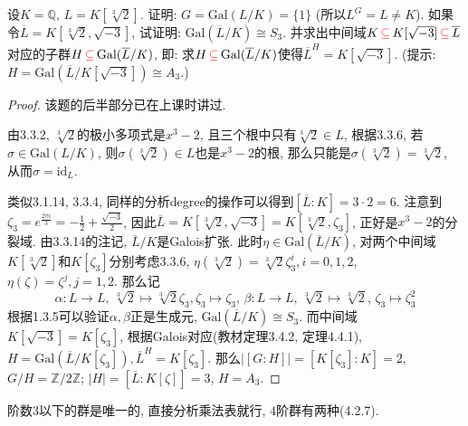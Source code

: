 \documentclass{../solutions-cn}
\begin{document}
\begin{exercise}[习题3.4.2]
    设$K = \mathbb{Q},\, L = K[\sqrt[3]{2}]$. 证明: $G = \mathrm{Gal}(L/K)=\{1\}$ (所以$L^G = L \neq K$). 如果令$\overline{L} = K[\sqrt[3]{2}, \sqrt{-3}]$, 试证明: $\mathrm{Gal}(\overline{L}/K) \cong S_3$. 并求出中间域$K \,\textcolor{red}{\subseteq}\, K[\sqrt{-3}] \,\textcolor{red}{\subseteq}\, \overline{L}$对应的子群$H \,\textcolor{red}{\subseteq}\, \mathrm{Gal}(\overline L/K)$, 即: 求$H \,\textcolor{red}{\subseteq}\, \mathrm{Gal}(\overline L/K)$使得$\overline{L}^{H} = K[\sqrt{-3}]$. (提示: $H = \mathrm{Gal}(\overline L/K[\sqrt{-3}]) \cong A_3$.)
\end{exercise}

\begin{proof}
    该题的后半部分已在上课时讲过.

    由3.3.2, $\sqrt[3]{2}$的极小多项式是$x^3 - 2$, 且三个根中只有$\sqrt[3]{2} \in L$, 根据3.3.6, 若$\sigma \in \mathrm{Gal}(L/K)$, 则$\sigma(\sqrt[3]{2}) \in L$也是$x^3 - 2$的根, 那么只能是$\sigma(\sqrt[3]{2}) = \sqrt[3]{2}$, 从而$\sigma = \mathrm{id}_L$.

    类似3.1.14, 3.3.4, 同样的分析degree的操作可以得到$[\overline{L}:K] = 3 \cdot 2 = 6$. 注意到$\zeta_3 = e^{\frac{2\pi i}{3}} = -\frac{1}{2} + \frac{\sqrt{-3}}{2}$, 因此$\overline{L} = K[\sqrt[3]{2}, \sqrt{-3}] = K[\sqrt[3]{2}, \zeta_3]$, 正好是$x^3 - 2$的分裂域. 由3.3.14的注记, $\overline{L}/K$是Galois扩张. 此时$\eta \in \mathrm{Gal}(\overline{L}/K)$, 对两个中间域$K[\sqrt[3]{2}]$和$K[\zeta_3]$分别考虑3.3.6, $\eta(\sqrt[3]{2}) = \sqrt[3]{2}\zeta_3^i, i = 0, 1, 2$, $\eta(\zeta) = \zeta^j, j = 1, 2$. 那么记
    \[
        \alpha:L \to L,\, \sqrt[3]{2} \mapsto \sqrt[3]{2}\zeta_3, \zeta_3 \mapsto \zeta_3,\, \beta:L \to L,\, \sqrt[3]{2} \mapsto \sqrt[3]{2},\, \zeta_3 \mapsto \zeta_3^2
    \]
    根据1.3.5可以验证$\alpha, \beta$正是生成元, $\mathrm{Gal}(\overline{L}/K) \cong S_3$. 而中间域$K[\sqrt{-3}] = K[\zeta_3]$, 根据Galois对应(教材定理3.4.2, 定理4.4.1), $H = \mathrm{Gal}(\overline{L}/K[\zeta_3]), \overline{L}^H = K[\zeta_3]$. 那么$|[G:H]| = [K[\zeta_3]:K] = 2$, $G/H = \mathbb{Z}/2\mathbb{Z}$; $|H| = [\overline{L}:K[\zeta]] = 3$, $H = A_3$. 
\end{proof}

\begin{remark}
    阶数$3$以下的群是唯一的, 直接分析乘法表就行, $4$阶群有两种(4.2.7).
\end{remark}
\end{document}
